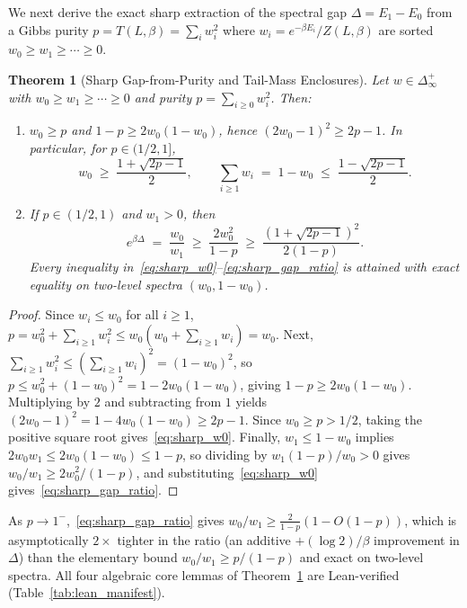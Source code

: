 \documentclass[11pt,a4paper]{article}
\newtheorem{theorem}{Theorem}[section]
\theoremstyle{definition}
\begin{document}
We next derive the exact sharp extraction of the spectral gap $\Delta = E_1 - E_0$ from a Gibbs purity $p = T(L,\beta) = \sum_i w_i^2$ where $w_i = e^{-\beta E_i}/Z(L,\beta)$ are sorted $w_0 \ge w_1 \ge \cdots \ge 0$.

\begin{theorem}[Sharp Gap-from-Purity and Tail-Mass Enclosures]
\label{thm:gap_from_purity}
Let $w \in \Delta_\infty^+$ with $w_0 \ge w_1 \ge \cdots \ge 0$ and purity $p = \sum_{i \ge 0} w_i^2$. Then:
\begin{enumerate}[label=(\alph*),leftmargin=2em,itemsep=2pt]
  \item $w_0 \ge p$ and $1 - p \ge 2 w_0 (1 - w_0)$, hence $(2w_0 - 1)^2 \ge 2p - 1$. In particular, for $p \in (1/2, 1]$,
  \begin{equation}
    w_0 \;\ge\; \frac{1 + \sqrt{2p - 1}}{2}, \qquad
    \sum_{i \ge 1} w_i \;=\; 1 - w_0 \;\le\; \frac{1 - \sqrt{2p - 1}}{2}.
    \label{eq:sharp_w0}
  \end{equation}
  \item If $p \in (1/2, 1)$ and $w_1 > 0$, then
  \begin{equation}
    e^{\beta \Delta} \;=\; \frac{w_0}{w_1} \;\ge\; \frac{2 w_0^2}{1 - p} \;\ge\; \frac{(1 + \sqrt{2p - 1})^2}{2(1 - p)}.
    \label{eq:sharp_gap_ratio}
  \end{equation}
  Every inequality in~\eqref{eq:sharp_w0}--\eqref{eq:sharp_gap_ratio} is attained with exact equality on two-level spectra $(w_0, 1-w_0)$.
\end{enumerate}
\end{theorem}

\begin{proof}
Since $w_i \le w_0$ for all $i \ge 1$, $p = w_0^2 + \sum_{i\ge 1} w_i^2 \le w_0(w_0 + \sum_{i\ge 1} w_i) = w_0$. Next, $\sum_{i \ge 1} w_i^2 \le (\sum_{i\ge 1} w_i)^2 = (1 - w_0)^2$, so $p \le w_0^2 + (1-w_0)^2 = 1 - 2w_0(1-w_0)$, giving $1 - p \ge 2 w_0 (1-w_0)$. Multiplying by $2$ and subtracting from $1$ yields $(2w_0-1)^2 = 1 - 4w_0(1-w_0) \ge 2p - 1$. Since $w_0 \ge p > 1/2$, taking the positive square root gives~\eqref{eq:sharp_w0}. Finally, $w_1 \le 1 - w_0$ implies $2 w_0 w_1 \le 2 w_0 (1 - w_0) \le 1 - p$, so dividing by $w_1(1-p)/w_0 > 0$ gives $w_0 / w_1 \ge 2 w_0^2 / (1-p)$, and substituting~\eqref{eq:sharp_w0} gives~\eqref{eq:sharp_gap_ratio}.
\end{proof}

As $p \to 1^-$,~\eqref{eq:sharp_gap_ratio} gives $w_0/w_1 \ge \frac{2}{1-p}(1 - O(1-p))$, which is asymptotically $2\times$ tighter in the ratio (an additive $+(\log 2)/\beta$ improvement in $\Delta$) than the elementary bound $w_0/w_1 \ge p/(1-p)$ and exact on two-level spectra. All four algebraic core lemmas of Theorem~\ref{thm:gap_from_purity} are Lean-verified (Table~\ref{tab:lean_manifest}).
\end{document}
